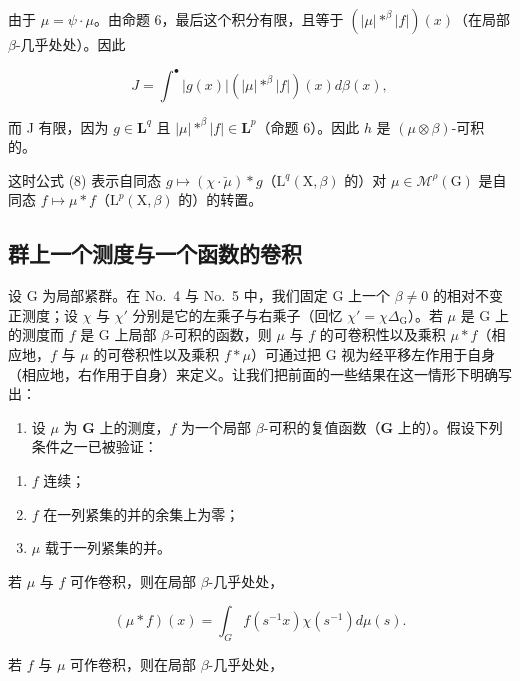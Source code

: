 由于 \(\mu = \psi \cdot \mu\)。由命题 6，最后这个积分有限，且等于 \((|\mu| *^{\beta} |f|)(x)\)（在局部 \(\beta\)-几乎处处）。因此

\[
J = \int^ {\bullet} | g (x) | \left(| \mu | * ^ {\beta} | f |\right) (x) d \beta (x),
\]

而 J 有限，因为 \(g \in \mathbf{L}^q\) 且 \(|\mu| *^\beta |f| \in \mathbf{L}^p\)（命题 6）。因此 \(h\) 是 \((\mu \otimes \beta)\)-可积的。

这时公式 (8) 表示自同态 \(g \mapsto (\chi \cdot \breve{\mu}) * g\)（\(\mathrm{L}^q(\mathrm{X},\beta)\) 的）对 \(\mu \in \mathcal{M}^\rho(\mathrm{G})\) 是自同态 \(f \mapsto \mu * f\)（\(\mathrm{L}^p(\mathrm{X},\beta)\) 的）的转置。

\subsection{群上一个测度与一个函数的卷积}

设 G 为局部紧群。在 No.~4 与 No.~5 中，我们固定 G 上一个 \(\beta \neq 0\) 的相对不变正测度；设 \(\chi\) 与 \(\chi'\) 分别是它的左乘子与右乘子（回忆 \(\chi' = \chi \Delta_{\mathrm{G}}\)）。若 \(\mu\) 是 G 上的测度而 \(f\) 是 G 上局部 \(\beta\)-可积的函数，则 \(\mu\) 与 \(f\) 的可卷积性以及乘积 \(\mu * f\)（相应地，\(f\) 与 \(\mu\) 的可卷积性以及乘积 \(f * \mu\)）可通过把 G 视为经平移左作用于自身（相应地，右作用于自身）来定义。让我们把前面的一些结果在这一情形下明确写出：

\begin{enumerate}
\def\labelenumi{\arabic{enumi})}
\tightlist
\item
  设 \(\mu\) 为 \(\mathbf{G}\) 上的测度，\(f\) 为一个局部 \(\beta\)-可积的复值函数（\(\mathbf{G}\) 上的）。假设下列条件之一已被验证：
\end{enumerate}

\begin{enumerate}
\def\labelenumi{(\roman{enumi})}
\item
  \(f\) 连续；
\item
  \(f\) 在一列紧集的并的余集上为零；
\item
  \(\mu\) 载于一列紧集的并。
\end{enumerate}

若 \(\mu\) 与 \(f\) 可作卷积，则在局部 \(\beta\)-几乎处处，

\[
(\mu * f) (x) = \int_ {G} f (s ^ {- 1} x) \chi (s ^ {- 1}) d \mu (s).\tag{10}
\]

若 \(f\) 与 \(\mu\) 可作卷积，则在局部 \(\beta\)-几乎处处，

